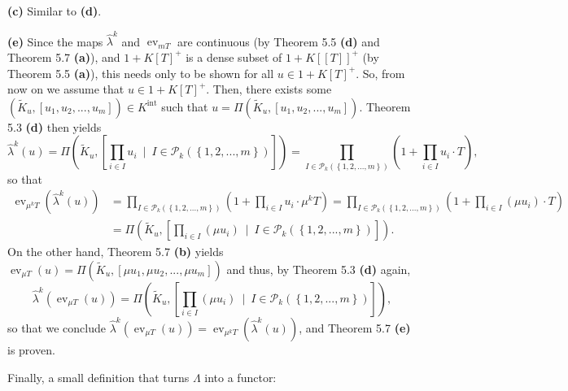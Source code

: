 \documentclass[12pt,final,notitlepage,onecolumn,german]{article}%
\begin{document}
\textbf{(c)} Similar to \textbf{(d)}.

\textbf{(e)} Since the maps $\widehat{\lambda}^{k}$ and $\operatorname*{ev}%
_{mT}$ are continuous (by Theorem 5.5 \textbf{(d) }and Theorem 5.7
\textbf{(a)}), and $1+K\left[  T\right]  ^{+}$ is a dense subset of
$1+K\left[  \left[  T\right]  \right]  ^{+}$ (by Theorem 5.5 \textbf{(a)}),
this needs only to be shown for all $u\in1+K\left[  T\right]  ^{+}$. So, from
now on we assume that $u\in1+K\left[  T\right]  ^{+}$. Then, there exists some
$\left(  \widetilde{K}_{u},\left[  u_{1},u_{2},...,u_{m}\right]  \right)  \in
K^{\operatorname*{int}}$ such that $u=\Pi\left(  \widetilde{K}_{u},\left[
u_{1},u_{2},...,u_{m}\right]  \right)  $. Theorem 5.3 \textbf{(d)} then yields%
\[
\widehat{\lambda}^{k}\left(  u\right)  =\Pi\left(  \widetilde{K}_{u},\left[
\prod\limits_{i\in I}u_{i}\ \mid\ I\in\mathcal{P}_{k}\left(  \left\{
1,2,...,m\right\}  \right)  \right]  \right)  =\prod\limits_{I\in
\mathcal{P}_{k}\left(  \left\{  1,2,...,m\right\}  \right)  }\left(
1+\prod\limits_{i\in I}u_{i}\cdot T\right)  ,
\]
so that%
\begin{align*}
\operatorname*{ev}\nolimits_{\mu^{k}T}\left(  \widehat{\lambda}^{k}\left(
u\right)  \right)   &  =\prod\limits_{I\in\mathcal{P}_{k}\left(  \left\{
1,2,...,m\right\}  \right)  }\left(  1+\prod\limits_{i\in I}u_{i}\cdot\mu
^{k}T\right)  =\prod\limits_{I\in\mathcal{P}_{k}\left(  \left\{
1,2,...,m\right\}  \right)  }\left(  1+\prod\limits_{i\in I}\left(  \mu
u_{i}\right)  \cdot T\right) \\
&  =\Pi\left(  \widetilde{K}_{u},\left[  \prod\limits_{i\in I}\left(  \mu
u_{i}\right)  \ \mid\ I\in\mathcal{P}_{k}\left(  \left\{  1,2,...,m\right\}
\right)  \right]  \right)  .
\end{align*}
On the other hand, Theorem 5.7 \textbf{(b)} yields $\operatorname*{ev}_{\mu
T}\left(  u\right)  =\Pi\left(  \widetilde{K}_{u},\left[  \mu u_{1},\mu
u_{2},...,\mu u_{m}\right]  \right)  $ and thus, by Theorem 5.3 \textbf{(d)}
again,%
\[
\widehat{\lambda}^{k}\left(  \operatorname*{ev}\nolimits_{\mu T}\left(
u\right)  \right)  =\Pi\left(  \widetilde{K}_{u},\left[  \prod\limits_{i\in
I}\left(  \mu u_{i}\right)  \ \mid\ I\in\mathcal{P}_{k}\left(  \left\{
1,2,...,m\right\}  \right)  \right]  \right)  ,
\]
so that we conclude $\widehat{\lambda}^{k}\left(  \operatorname*{ev}_{\mu
T}\left(  u\right)  \right)  =\operatorname*{ev}_{\mu^{k}T}\left(
\widehat{\lambda}^{k}\left(  u\right)  \right)  $, and Theorem 5.7
\textbf{(e)} is proven.

Finally, a small definition that turns $\Lambda$ into a functor:
\end{document}
